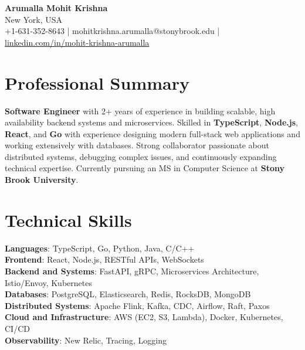 \documentclass[letterpaper,11pt]{article}
\begin{document}
\begin{center}
  {\Large \textbf{Arumalla Mohit Krishna}} \\
  New York, USA \\
  +1-631-352-8643 \enspace | \enspace mohitkrishna.arumalla@stonybrook.edu \enspace | \enspace \href{https://www.linkedin.com/in/mohit-krishna-arumalla}{linkedin.com/in/mohit-krishna-arumalla}
\end{center}

\section{Professional Summary}
  \begin{itemize}[leftmargin=0.15in, label={}]
    \small{\item{
     \textbf{Software Engineer} with 2+ years of experience in building scalable, high availability backend systems and microservices. Skilled in \textbf{TypeScript}, \textbf{Node.js}, \textbf{React}, and \textbf{Go} with experience designing modern full-stack web applications and working extensively with databases. Strong collaborator passionate about distributed systems, debugging complex issues, and continuously expanding technical expertise. Currently pursuing an MS in Computer Science at \textbf{Stony Brook University}.
    }}
  \end{itemize}
\vspace{-16pt}

\section{Technical Skills}
 \begin{itemize}[leftmargin=0.15in, label={}]
    \small{\item{
     \textbf{Languages}: TypeScript, Go, Python, Java, C/C++ \\
     \textbf{Frontend}: React, Node.js, RESTful APIs, WebSockets \\
     \textbf{Backend and Systems}: FastAPI, gRPC, Microservices Architecture, Istio/Envoy, Kubernetes \\
     \textbf{Databases}: PostgreSQL, Elasticsearch, Redis, RocksDB, MongoDB \\
     \textbf{Distributed Systems}: Apache Flink, Kafka, CDC, Airflow, Raft, Paxos \\
     \textbf{Cloud and Infrastructure}: AWS (EC2, S3, Lambda), Docker, Kubernetes, CI/CD \\
     \textbf{Observability}: New Relic, Tracing, Logging
    }}
 \end{itemize}
\vspace{-16pt}
\end{document}
